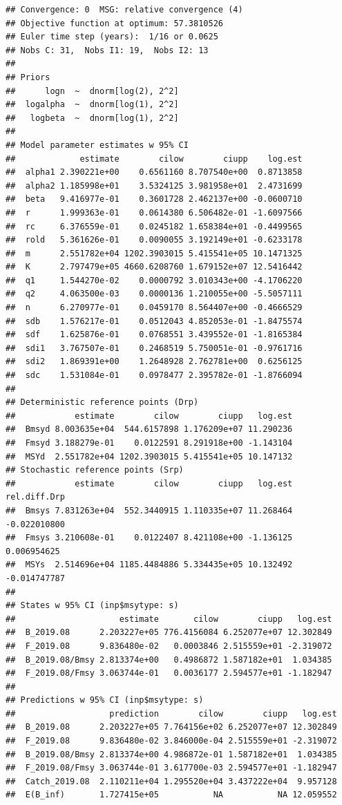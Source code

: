 \documentclass[
]{article}
\begin{document}
\begin{verbatim}
## Convergence: 0  MSG: relative convergence (4)
## Objective function at optimum: 57.3810526
## Euler time step (years):  1/16 or 0.0625
## Nobs C: 31,  Nobs I1: 19,  Nobs I2: 13
## 
## Priors
##      logn  ~  dnorm[log(2), 2^2]
##  logalpha  ~  dnorm[log(1), 2^2]
##   logbeta  ~  dnorm[log(1), 2^2]
## 
## Model parameter estimates w 95% CI 
##             estimate        cilow        ciupp    log.est  
##  alpha1 2.390221e+00    0.6561160 8.707540e+00  0.8713858  
##  alpha2 1.185998e+01    3.5324125 3.981958e+01  2.4731699  
##  beta   9.416977e-01    0.3601728 2.462137e+00 -0.0600710  
##  r      1.999363e-01    0.0614380 6.506482e-01 -1.6097566  
##  rc     6.376559e-01    0.0245182 1.658384e+01 -0.4499565  
##  rold   5.361626e-01    0.0090055 3.192149e+01 -0.6233178  
##  m      2.551782e+04 1202.3903015 5.415541e+05 10.1471325  
##  K      2.797479e+05 4660.6208760 1.679152e+07 12.5416442  
##  q1     1.544270e-02    0.0000792 3.010343e+00 -4.1706220  
##  q2     4.063500e-03    0.0000136 1.210055e+00 -5.5057111  
##  n      6.270977e-01    0.0459170 8.564407e+00 -0.4666529  
##  sdb    1.576217e-01    0.0512043 4.852053e-01 -1.8475574  
##  sdf    1.625876e-01    0.0768551 3.439552e-01 -1.8165384  
##  sdi1   3.767507e-01    0.2468519 5.750051e-01 -0.9761716  
##  sdi2   1.869391e+00    1.2648928 2.762781e+00  0.6256125  
##  sdc    1.531084e-01    0.0978477 2.395782e-01 -1.8766094  
##  
## Deterministic reference points (Drp)
##            estimate        cilow        ciupp   log.est  
##  Bmsyd 8.003635e+04  544.6157898 1.176209e+07 11.290236  
##  Fmsyd 3.188279e-01    0.0122591 8.291918e+00 -1.143104  
##  MSYd  2.551782e+04 1202.3903015 5.415541e+05 10.147132  
## Stochastic reference points (Srp)
##            estimate        cilow        ciupp   log.est rel.diff.Drp  
##  Bmsys 7.831263e+04  552.3440915 1.110335e+07 11.268464 -0.022010800  
##  Fmsys 3.210608e-01    0.0122407 8.421108e+00 -1.136125  0.006954625  
##  MSYs  2.514696e+04 1185.4484886 5.334435e+05 10.132492 -0.014747787  
## 
## States w 95% CI (inp$msytype: s)
##                     estimate       cilow        ciupp   log.est  
##  B_2019.08      2.203227e+05 776.4156084 6.252077e+07 12.302849  
##  F_2019.08      9.836480e-02   0.0003846 2.515559e+01 -2.319072  
##  B_2019.08/Bmsy 2.813374e+00   0.4986872 1.587182e+01  1.034385  
##  F_2019.08/Fmsy 3.063744e-01   0.0036177 2.594577e+01 -1.182947  
## 
## Predictions w 95% CI (inp$msytype: s)
##                   prediction        cilow        ciupp   log.est  
##  B_2019.08      2.203227e+05 7.764156e+02 6.252077e+07 12.302849  
##  F_2019.08      9.836480e-02 3.846000e-04 2.515559e+01 -2.319072  
##  B_2019.08/Bmsy 2.813374e+00 4.986872e-01 1.587182e+01  1.034385  
##  F_2019.08/Fmsy 3.063744e-01 3.617700e-03 2.594577e+01 -1.182947  
##  Catch_2019.08  2.110211e+04 1.295520e+04 3.437222e+04  9.957128  
##  E(B_inf)       1.727415e+05           NA           NA 12.059552
\end{verbatim}
\end{document}
